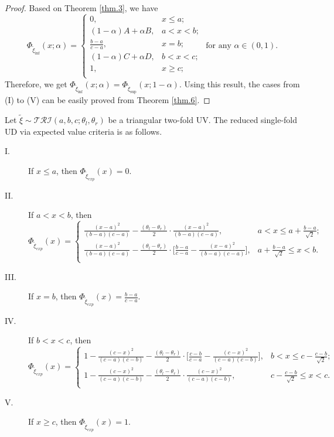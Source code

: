 \begin{proof}
	Based on Theorem \ref{thm.3}, we have 
	\[\Phi_{\tilde{\xi}_{\inf}}(x;\alpha)=\left\{
	\begin{array}{ll}
		0, & x\leq a;\\
		(1-\alpha)A+\alpha B, &  a<x<b;\\
		\frac{b-a}{c-a}, &  x=b;\\
		(1-\alpha)C+\alpha D, &  b<x<c;\\
		1, &  x\geq c;\\
	\end{array}
	\right.
	 \text{ for any }\alpha \in (0,1).\] 
	 Therefore, we get $\Phi_{\tilde{\xi}_{\inf}}(x;\alpha)=\Phi_{\tilde{\xi}_{\sup}}(x;1-\alpha)$. Using this result, the cases from (I) to (V) can be easily proved from Theorem \ref{thm.6}.
\end{proof}
\begin{theorem}\label{thm.8}
	Let $\tilde{\xi}\sim \mathcal{TRI}(a,b,c;\theta_l,\theta_r)$ be a triangular two-fold UV. The reduced single-fold UD via expected value criteria is as follows.
	\begin{description}
		\item[ I.] If $x\leq a$, then $\Phi_{\tilde{\xi}_{exp}}(x)=0.$  
		\item[ II.] If $a< x< b$, then
		\[\Phi_{\tilde{\xi}_{exp}}(x)=\left\{
		\begin{array}{ll}
			\frac{(x-a)^2}{(b-a)(c-a)}-\frac{(\theta_l-\theta_r)}{2}\cdot\frac{(x-a)^2}{(b-a)(c-a)}, & a<x\leq a+\frac{b-a}{\sqrt{2}};\\
			\frac{(x-a)^2}{(b-a)(c-a)}-\frac{(\theta_l-\theta_r)}{2}\cdot\big[\frac{b-a}{c-a}-\frac{(x-a)^2}{(b-a)(c-a)}\big], & a+\frac{b-a}{\sqrt{2}}\leq x<b.\\
		\end{array}
		\right.
		\]
		\item[ III.]  If $x=b$, then $\Phi_{\tilde{\xi}_{exp}}(x)=\frac{b-a}{c-a}.$ 
		\item[ IV.] If $b< x< c$, then
		\[\Phi_{\tilde{\xi}_{exp}}(x)=\left\{
		\begin{array}{ll}
			1-\frac{(c-x)^2}{(c-a)(c-b)}-\frac{(\theta_l-\theta_r)}{2}\cdot\big[\frac{c-b}{c-a}-\frac{(c-x)^2}{(c-a)(c-b)}\big], & b<x\leq c-\frac{c-b}{\sqrt{2}};\\
			1-\frac{(c-x)^2}{(c-a)(c-b)}-\frac{(\theta_l-\theta_r)}{2}\cdot\frac{(c-x)^2}{(c-a)(c-b)}, &  c-\frac{c-b}{\sqrt{2}}\leq x<c.\\
		\end{array}
		\right.
		\] 
		\item[ V.] If $x\geq c$, then $\Phi_{\tilde{\xi}_{exp}}(x)=1.$     
	\end{description} 
\end{theorem}

